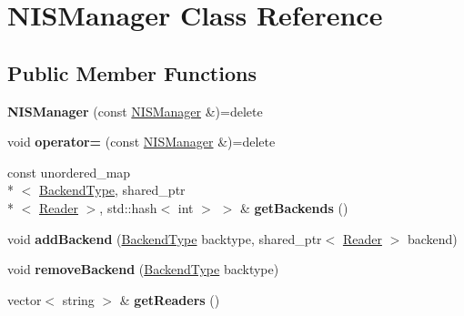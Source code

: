 \hypertarget{classNISManager}{\section{N\-I\-S\-Manager Class Reference}
\label{classNISManager}
}
\subsection*{Public Member Functions}
\begin{DoxyCompactItemize}
\item 
\hypertarget{classNISManager_a5694196f1df5f18ab9a2c8061075175e}{{\bfseries N\-I\-S\-Manager} (const \hyperlink{classNISManager}{N\-I\-S\-Manager} \&)=delete}\label{classNISManager_a5694196f1df5f18ab9a2c8061075175e}

\item 
\hypertarget{classNISManager_af191b49bf25bbf9bfd2cb5bd9cd9c434}{void {\bfseries operator=} (const \hyperlink{classNISManager}{N\-I\-S\-Manager} \&)=delete}\label{classNISManager_af191b49bf25bbf9bfd2cb5bd9cd9c434}

\item 
\hypertarget{classNISManager_a6cad1a44e5ca799fc820c40fecd5cbf2}{const unordered\-\_\-map\\*
$<$ \hyperlink{nis__types_8h_acee299fbb7d897867808250049524594}{Backend\-Type}, shared\-\_\-ptr\\*
$<$ \hyperlink{classnis_1_1interface_1_1Reader}{Reader} $>$, std\-::hash$<$ int $>$ $>$ \& {\bfseries get\-Backends} ()}\label{classNISManager_a6cad1a44e5ca799fc820c40fecd5cbf2}

\item 
\hypertarget{classNISManager_a16f0f685a40a858762febd50f158b0ab}{void {\bfseries add\-Backend} (\hyperlink{nis__types_8h_acee299fbb7d897867808250049524594}{Backend\-Type} backtype, shared\-\_\-ptr$<$ \hyperlink{classnis_1_1interface_1_1Reader}{Reader} $>$ backend)}\label{classNISManager_a16f0f685a40a858762febd50f158b0ab}

\item 
\hypertarget{classNISManager_ae1ff32a0e450569a8091fb5373874d7e}{void {\bfseries remove\-Backend} (\hyperlink{nis__types_8h_acee299fbb7d897867808250049524594}{Backend\-Type} backtype)}\label{classNISManager_ae1ff32a0e450569a8091fb5373874d7e}

\item 
\hypertarget{classNISManager_a27a3db14eb804948d4031f115d3f6234}{vector$<$ string $>$ \& {\bfseries get\-Readers} ()}\label{classNISManager_a27a3db14eb804948d4031f115d3f6234}


\end{DoxyCompactItemize}
